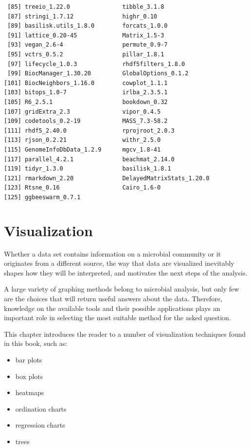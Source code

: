 \documentclass[
]{book}
\providecommand{\tightlist}{%
  \setlength{\itemsep}{0pt}\setlength{\parskip}{0pt}}
\begin{document}
\begin{verbatim}
 [85] treeio_1.22.0               tibble_3.1.8               
 [87] stringi_1.7.12              highr_0.10                 
 [89] basilisk.utils_1.8.0        forcats_1.0.0              
 [91] lattice_0.20-45             Matrix_1.5-3               
 [93] vegan_2.6-4                 permute_0.9-7              
 [95] vctrs_0.5.2                 pillar_1.8.1               
 [97] lifecycle_1.0.3             rhdf5filters_1.8.0         
 [99] BiocManager_1.30.20         GlobalOptions_0.1.2        
[101] BiocNeighbors_1.16.0        cowplot_1.1.1              
[103] bitops_1.0-7                irlba_2.3.5.1              
[105] R6_2.5.1                    bookdown_0.32              
[107] gridExtra_2.3               vipor_0.4.5                
[109] codetools_0.2-19            MASS_7.3-58.2              
[111] rhdf5_2.40.0                rprojroot_2.0.3            
[113] rjson_0.2.21                withr_2.5.0                
[115] GenomeInfoDbData_1.2.9      mgcv_1.8-41                
[117] parallel_4.2.1              beachmat_2.14.0            
[119] tidyr_1.3.0                 basilisk_1.8.1             
[121] rmarkdown_2.20              DelayedMatrixStats_1.20.0  
[123] Rtsne_0.16                  Cairo_1.6-0                
[125] ggbeeswarm_0.7.1           
\end{verbatim}

\hypertarget{viz-chapter}{%
\chapter{Visualization}\label{viz-chapter}}

Whether a data set contains information on a microbial community or it
originates from a different source, the way that data are visualized
inevitably shapes how they will be interpreted, and motivates the next
steps of the analysis.

A large variety of graphing methods belong to microbial analysis, but
only few are the choices that will return useful answers about the
data. Therefore, knowledge on the available tools and their possible
applications plays an important role in selecting the most suitable
method for the asked question.

This chapter introduces the reader to a number of visualization techniques found in this book, such as:

\begin{itemize}
\tightlist
\item
  bar plots
\item
  box plots
\item
  heatmaps
\item
  ordination charts
\item
  regression charts
\item
  trees
\end{itemize}
\end{document}
